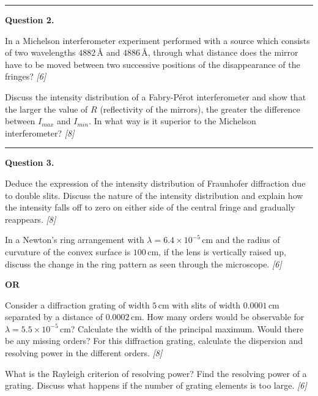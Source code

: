 \documentclass[11pt,a4paper]{article}
\newcommand{\pts}[1]{\hfill   \textit{[#1]}}
\begin{document}
\medskip\rule{\linewidth}{0.2pt}




\noindent   \textbf{Question 2.}

\begin{parts}
  \item In a Michelson interferometer experiment performed with a source which consists of two wavelengths $4882\, \text{\AA}$ and $4886\, \text{\AA}$, through what distance does the mirror have to be moved between two successive positions of the disappearance of the fringes? \pts{6}
  \item Discuss the intensity distribution of a Fabry-P\'erot interferometer and show that the larger the value of $R$ (reflectivity of the mirrors), the greater the difference between $I_{max}$ and $I_{min}$. In what way is it superior to the Michelson interferometer? \pts{8}
\end{parts}

\medskip\rule{\linewidth}{0.2pt}




\noindent   \textbf{Question 3.}

\begin{parts}
  \item Deduce the expression of the intensity distribution of Fraunhofer diffraction due to double slits. Discuss the nature of the intensity distribution and explain how the intensity falls off to zero on either side of the central fringe and gradually reappears. \pts{8}
  \item In a Newton's ring arrangement with $\lambda = 6.4  \times 10^{-5}\, \text{cm}$ and the radius of curvature of the convex surface is $100\, \text{cm}$, if the lens is vertically raised up, discuss the change in the ring pattern as seen through the microscope. \pts{6}
\end{parts}
\hfill   \textbf{OR}

\begin{parts}
  \item Consider a diffraction grating of width $5\, \text{cm}$ with slits of width $0.0001\, \text{cm}$ separated by a distance of $0.0002\, \text{cm}$. How many orders would be observable for $\lambda = 5.5  \times 10^{-5}\, \text{cm}$? Calculate the width of the principal maximum. Would there be any missing orders? For this diffraction grating, calculate the dispersion and resolving power in the different orders. \pts{8}
  \item What is the Rayleigh criterion of resolving power? Find the resolving power of a grating. Discuss what happens if the number of grating elements is too large. \pts{6}
\end{parts}
\end{document}
